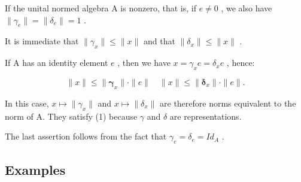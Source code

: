 If the unital normed algebra A is nonzero, that is, if \(e \neq 0\) , we also have \(\|\gamma_{e}\| = \|\delta_{e}\| = 1\) .

It is immediate that \(\|\gamma_{x}\|\leqslant\|x\|\) and that \(\|\delta_{x}\|\leqslant\|x\|\) .

If A has an identity element \(e\) , then we have \(x = \gamma_x e = \delta_x e\) , hence:

\[
\| x \| \leqslant \| \boldsymbol {\gamma} _ {x} \| \cdot \| e \| \quad \| x \| \leqslant \| \boldsymbol {\delta} _ {x} \| \cdot \| e \|.\tag{2}
\]

In this case, \(x \mapsto \|\gamma_{x}\|\) and \(x \mapsto \|\delta_{x}\|\) are therefore norms equivalent to the norm of A. They satisfy (1) because \(\gamma\) and \(\delta\) are representations.

The last assertion follows from the fact that \(\gamma_{e} = \delta_{e} = Id_{A}\) .

\subsection{Examples}

